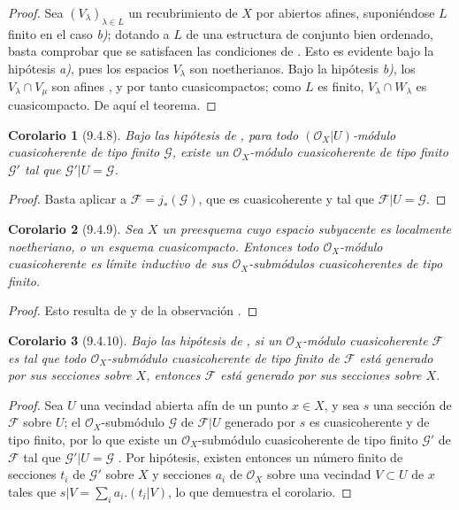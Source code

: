 \documentclass[oneside]{amsart}
\theoremstyle{ega-env-style}
\theoremstyle{ega-thm-env-style}
\newtheorem*{corollary}{Corolario}
\theoremstyle{ega-defn-env-style}
\newcommand{\oldpage}[2][]{{\marginnote{\normalfont{\textbf{#1}~|~#2}}}\ignorespaces}
\let\EGAOriginalLabel\label
\renewcommand{\label}[1]{\phantomsection\EGAOriginalLabel{#1}}
\begin{document}
\oldpage[I]{176}
\begin{proof}
Sea $(V_\lambda)_{\lambda\in L}$ un recubrimiento de $X$ por abiertos afines,
suponiéndose $L$ finito en el caso \emph{b)}; dotando a $L$ de una estructura de conjunto
bien ordenado, basta comprobar que se satisfacen las condiciones de .
Esto es evidente bajo la hipótesis \emph{a)}, pues los espacios $V_\lambda$ son noetherianos.
Bajo la hipótesis \emph{b)}, los $V_\lambda\cap V_\mu$ son afines , y por
tanto cuasicompactos; como $L$ es finito, $V_\lambda\cap W_\lambda$ es cuasicompacto.
De aquí el teorema.
\end{proof}

\begin{corollary}[9.4.8]
\label{I.9.4.8}
Bajo las hipótesis de , para todo $(\mathscr{O}_X|U)$-módulo cuasicoherente
de tipo finito $\mathscr{G}$, existe un $\mathscr{O}_X$-módulo cuasicoherente de tipo finito
$\mathscr{G}'$ tal que $\mathscr{G}'|U=\mathscr{G}$.
\end{corollary}

\begin{proof}
Basta aplicar  a $\mathscr{F}=j_*(\mathscr{G})$, que es cuasicoherente
 y tal que $\mathscr{F}|U=\mathscr{G}$.
\end{proof}

\begin{corollary}[9.4.9]
\label{I.9.4.9}
Sea $X$ un preesquema cuyo espacio subyacente es localmente noetheriano, o un esquema
cuasicompacto. Entonces todo $\mathscr{O}_X$-módulo cuasicoherente es límite inductivo de
sus $\mathscr{O}_X$-submódulos cuasicoherentes de tipo finito.
\end{corollary}

\begin{proof}
Esto resulta de  y de la observación .
\end{proof}

\begin{corollary}[9.4.10]
\label{I.9.4.10}
Bajo las hipótesis de , si un $\mathscr{O}_X$-módulo cuasicoherente
$\mathscr{F}$ es tal que todo $\mathscr{O}_X$-submódulo cuasicoherente de tipo finito de $\mathscr{F}$
está generado por sus secciones sobre $X$, entonces $\mathscr{F}$ está generado por sus
secciones sobre $X$.
\end{corollary}

\begin{proof}
Sea $U$ una vecindad abierta afín de un punto $x\in X$, y sea $s$ una sección de
$\mathscr{F}$ sobre $U$; el $\mathscr{O}_X$-submódulo $\mathscr{G}$ de $\mathscr{F}|U$ generado por $s$ es
cuasicoherente y de tipo finito, por lo que existe un $\mathscr{O}_X$-submódulo cuasicoherente
de tipo finito $\mathscr{G}'$ de $\mathscr{F}$ tal que $\mathscr{G}'|U=\mathscr{G}$ . Por
hipótesis, existen entonces un número finito de secciones $t_i$ de $\mathscr{G}'$ sobre $X$ y
secciones $a_i$ de $\mathscr{O}_X$ sobre una vecindad $V\subset U$ de $x$ tales que
$s|V=\sum_i a_i.(t_i|V)$, lo que demuestra el corolario.
\end{proof}
\end{document}
